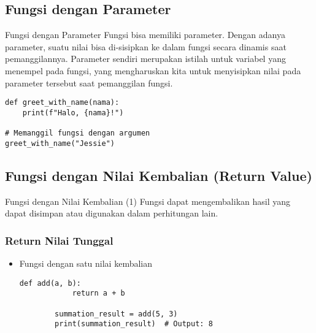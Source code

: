 \documentclass[aspectratio=169, table]{beamer}
\begin{document}
\subsection{Fungsi dengan Parameter}

\begin{frame}[fragile]{Fungsi dengan Parameter}
Fungsi bisa memiliki parameter. Dengan adanya parameter, suatu nilai bisa di-sisipkan ke dalam fungsi secara dinamis saat pemanggilannya.
Parameter sendiri merupakan istilah untuk variabel yang menempel pada fungsi, yang mengharuskan kita untuk menyisipkan nilai pada parameter tersebut saat pemanggilan fungsi.

\begin{lstlisting}[style=PythonStyle, caption={Kode Python: parameter_function.py}]
def greet_with_name(nama):
    print(f"Halo, {nama}!")

# Memanggil fungsi dengan argumen
greet_with_name("Jessie")
\end{lstlisting}
\end{frame}

\subsection{Fungsi dengan Nilai Kembalian (Return Value)}

\begin{frame}[fragile]{Fungsi dengan Nilai Kembalian (1)}
Fungsi dapat mengembalikan hasil yang dapat disimpan atau digunakan dalam perhitungan lain.

\subsubsection{Return Nilai Tunggal}
\begin{itemize}
    \item Fungsi dengan satu nilai kembalian
        \begin{lstlisting}[style=PythonStyle, caption={Kode Python: function_with_single_return.py}]
        def add(a, b):
            return a + b

        summation_result = add(5, 3)
        print(summation_result)  # Output: 8
        \end{lstlisting}
\end{itemize}
\end{frame}
\end{document}
